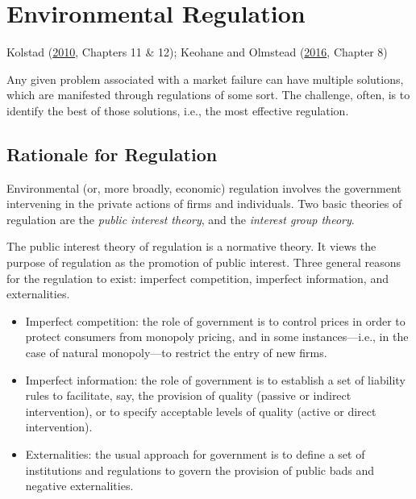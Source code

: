 \documentclass[
]{book}
\providecommand{\tightlist}{%
  \setlength{\itemsep}{0pt}\setlength{\parskip}{0pt}}
\begin{document}
\hypertarget{environmental-regulation}{%
\chapter{Environmental Regulation}\label{environmental-regulation}}

Kolstad (\protect\hyperlink{ref-kolstad2010}{2010}, Chapters 11 \& 12); Keohane and Olmstead (\protect\hyperlink{ref-keohane2016}{2016}, Chapter 8)

Any given problem associated with a market failure can have multiple solutions, which are manifested through regulations of some sort. The challenge, often, is to identify the best of those solutions, i.e., the most effective regulation.

\hypertarget{rationale-for-regulation}{%
\section{Rationale for Regulation}\label{rationale-for-regulation}}

Environmental (or, more broadly, economic) regulation involves the government intervening in the private actions of firms and individuals. Two basic theories of regulation are the \emph{public interest theory}, and the \emph{interest group theory}.

The public interest theory of regulation is a normative theory. It views the purpose of regulation as the promotion of public interest. Three general reasons for the regulation to exist: imperfect competition, imperfect information, and externalities.

\begin{itemize}
\tightlist
\item
  Imperfect competition: the role of government is to control prices in order to protect consumers from monopoly pricing, and in some instances---i.e., in the case of natural monopoly---to restrict the entry of new firms.
\item
  Imperfect information: the role of government is to establish a set of liability rules to facilitate, say, the provision of quality (passive or indirect intervention), or to specify acceptable levels of quality (active or direct intervention).
\item
  Externalities: the usual approach for government is to define a set of institutions and regulations to govern the provision of public bads and negative externalities.
\end{itemize}
\end{document}

